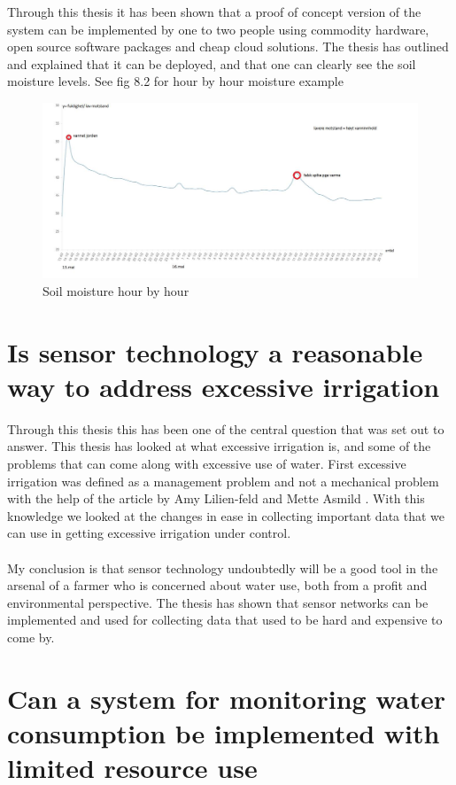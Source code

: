 \documentclass[]{uiophd}
\begin{document}
Through this thesis it has been shown that a proof of concept version of the system can be implemented by one to two people using commodity hardware, open source software packages and cheap cloud solutions. The thesis has outlined and explained that it can be deployed, and that one can clearly see the soil moisture levels. See fig 8.2 for hour by hour moisture example
 \begin{figure}[h]
\caption{Soil moisture hour by hour}
\centering
\includegraphics[width=14cm]{warter_hourbyhour.png}
\end{figure}


\section{ Is sensor technology a reasonable way to address excessive irrigation}

Through this thesis this has been one of the central question that was set out to answer. This thesis has looked at what excessive irrigation is, and some of the problems that can come along with excessive use of water. First excessive irrigation was defined as a management problem and not a mechanical problem with the help of the article by Amy Lilien-feld and Mette Asmild \cite{LILIENFELD200773}. With this knowledge we looked at the changes in ease in collecting important data that we can use in getting excessive irrigation under control. 
\\\\
My conclusion is that sensor technology undoubtedly will be a good tool in the arsenal of a farmer who is concerned about water use, both from a profit and environmental perspective. The thesis has shown that sensor networks can be implemented and used for collecting data that used to be hard and expensive to come by.

\section{ Can a system for monitoring water consumption be implemented with limited resource use}
\end{document}
